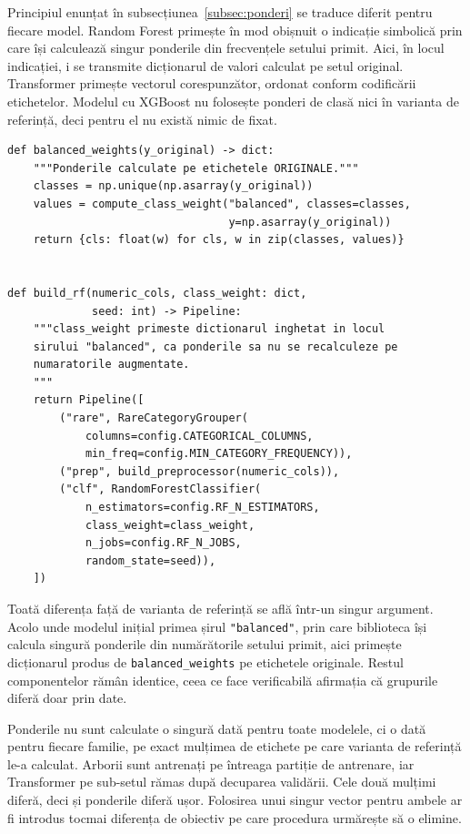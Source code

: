 Principiul enunțat în subsecțiunea~\ref{subsec:ponderi} se traduce diferit pentru fiecare model. Random Forest primește în mod obișnuit o indicație simbolică prin care își calculează singur ponderile din frecvențele setului primit. Aici, în locul indicației, i se transmite dicționarul de valori calculat pe setul original. Transformer primește vectorul corespunzător, ordonat conform codificării etichetelor. Modelul cu XGBoost nu folosește ponderi de clasă nici în varianta de referință, deci pentru el nu există nimic de fixat.

\begin{verbatim}
def balanced_weights(y_original) -> dict:
    """Ponderile calculate pe etichetele ORIGINALE."""
    classes = np.unique(np.asarray(y_original))
    values = compute_class_weight("balanced", classes=classes,
                                  y=np.asarray(y_original))
    return {cls: float(w) for cls, w in zip(classes, values)}


def build_rf(numeric_cols, class_weight: dict,
             seed: int) -> Pipeline:
    """class_weight primeste dictionarul inghetat in locul
    sirului "balanced", ca ponderile sa nu se recalculeze pe
    numaratorile augmentate.
    """
    return Pipeline([
        ("rare", RareCategoryGrouper(
            columns=config.CATEGORICAL_COLUMNS,
            min_freq=config.MIN_CATEGORY_FREQUENCY)),
        ("prep", build_preprocessor(numeric_cols)),
        ("clf", RandomForestClassifier(
            n_estimators=config.RF_N_ESTIMATORS,
            class_weight=class_weight,
            n_jobs=config.RF_N_JOBS,
            random_state=seed)),
    ])
\end{verbatim}

Toată diferența față de varianta de referință se află într-un singur argument.
Acolo unde modelul inițial primea șirul \texttt{"balanced"}, prin care
biblioteca își calcula singură ponderile din numărătorile setului primit, aici
primește dicționarul produs de \texttt{balanced\_weights} pe etichetele
originale. Restul componentelor rămân identice, ceea ce face verificabilă
afirmația că grupurile diferă doar prin date.

Ponderile nu sunt calculate o singură dată pentru toate modelele, ci o dată pentru fiecare familie, pe exact mulțimea de etichete pe care varianta de referință le-a calculat. Arborii sunt antrenați pe întreaga partiție de antrenare, iar Transformer pe sub-setul rămas după decuparea validării. Cele două mulțimi diferă, deci și ponderile diferă ușor. Folosirea unui singur vector pentru ambele ar fi introdus tocmai diferența de obiectiv pe care procedura urmărește să o elimine.

